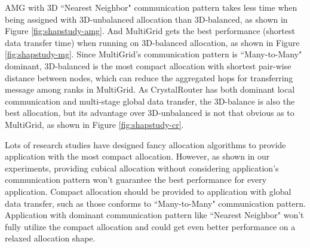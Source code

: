 AMG with 3D ``Nearest Neighbor" communication pattern takes less time when being assigned with 3D-unbalanced allocation than 3D-balanced, as shown in Figure \ref{fig:shapstudy-amg}. And MultiGrid gets the best performance (shortest data transfer time) when running on 3D-balanced allocation, as shown in Figure \ref{fig:shapstudy-mg}. Since MultiGrid's communication pattern is ``Many-to-Many" dominant, 3D-balanced is the most compact allocation with shortest pair-wise distance between nodes, which can reduce the aggregated hops for transferring message among ranks in MultiGrid. As CrystalRouter has both dominant local communication and multi-stage global data transfer, the 3D-balance is also the best allocation, but its advantage over 3D-unbalanced is not that obvious as to MultiGrid, as shown in Figure \ref{fig:shapstudy-cr}.

Lots of research studies have designed fancy allocation algorithms to provide application with the most compact allocation\cite{leung,LO}. However, as shown in our experiments, providing cubical allocation without considering application's communication pattern won't guarantee the best performance for every application. Compact allocation should be provided to application with global data transfer, such as those conforms to ``Many-to-Many" communication pattern. Application with dominant communication pattern like ``Nearest Neighbor" won't fully utilize the compact allocation and could get even better performance on a relaxed allocation shape. 



